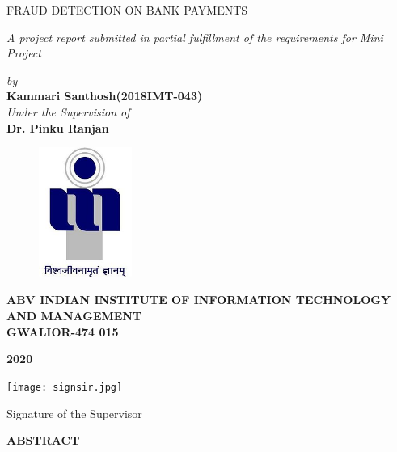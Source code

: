\documentclass[12pt]{article}
\begin{document}
\begin{titlepage}
\begin{center}
{\LARGE  FRAUD DETECTION ON BANK PAYMENTS} \\
\end{center}
\begin{center}
\vspace{0.6in}
{\large \it A project report submitted in partial fulfillment of the requirements for Mini Project} \\
\vspace{0.2in}

{\large \it by\\}
\vspace{0.3in}
{\large \bf Kammari Santhosh(2018IMT-043)}\\
\vspace{0.3in}
{\large \it Under the Supervision of\\}
\vspace{0.3in}
{\large \bf Dr. Pinku Ranjan}\\
\end {center}
\vspace{0.4in}
\begin{figure}[h]
\centerline{\includegraphics[width=1.2in]{ABVIIITM_logo.jpg}}
\end{figure}
\begin{center}
{\Large \bf ABV INDIAN INSTITUTE OF INFORMATION TECHNOLOGY AND MANAGEMENT\\
GWALIOR-474 015\\}

{\Large \bf 2020\\}
\end{center}
\begin{flushright}
  \begin{flushright}
           \hfill\texttt{[image: signsir.jpg]}

  \end{flushright}
Signature of the Supervisor
\end{flushright}
\end{titlepage}
\pagebreak
\newpage
\begin{center}
{\large \bf ABSTRACT}

\end{center}
\end{document}
